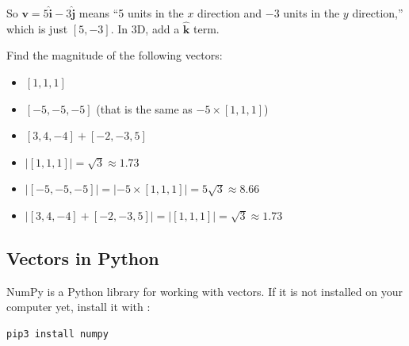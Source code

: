 So $\mathbf{v} = 5\hat{\mathbf{i}} - 3\hat{\mathbf{j}}$ means ``5 units
in the $x$ direction and $-3$ units in the $y$ direction,'' which is just
$[5, -3]$. In 3D, add a $\hat{\mathbf{k}}$ term. 

\begin{center}
\end{center}

\begin{Exercise}[title={Magnitude of a Vector}, label=vector_mag]
    Find the magnitude of the following vectors:
    \begin{itemize}
        \item $[1, 1, 1]$
        \item $[-5, -5, -5]$ (that is the same as $-5 \times [1, 1, 1]$)
        \item $[3, 4, -4] + [-2, -3, 5]$
    \end{itemize}
    \end{Exercise}
    \begin{Answer}[ref=vector_mag]
        \begin{itemize}
            \item $|[1, 1, 1]| = \sqrt{3} \approx 1.73 $
            \item $|[-5, -5, -5]| = |-5 \times [1,1,1]| = 5 \sqrt{3} \approx 
            8.66$
            \item $|[3, 4, -4] + [-2, -3, 5]| = | [1,1,1] | = \sqrt{3} 
            \approx 1.73$ 
        \end{itemize}
    \end{Answer}

\subsection{Vectors in Python}

NumPy is a Python library for working with vectors. If it is not
installed on your computer yet, install it with :

\begin{verbatim}
pip3 install numpy
\end{verbatim}

